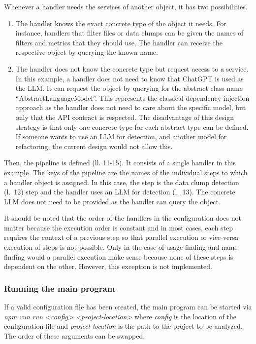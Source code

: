 Whenever a handler needs the services of another object, it has two possibilities.
\begin{enumerate}
    \item The handler knows the exact concrete type of the object it needs. For instance, handlers that filter files or data clumps can be given the names of filters and metrics that they should use. The handler can receive the respective object by querying the known name. 

    \item The handler does not know the concrete type but request access to a service. In this example, a handler does not need to know that ChatGPT is used as the \ac{LLM}. It can request the object by querying for the abstract class name \enquote{AbstractLanguageModel}. This represents the classical dependency injection approach as the handler does not need to care about the specific model, but only that the \ac{API} contract is respected. The disadvantage of this design strategy is that only one  concrete type for each abstract type can be defined. If someone wants to use an \ac{LLM} for detection, and another model for refactoring, the current design would not allow this. 
\end{enumerate}




Then, the pipeline is defined (ll. 11-15). It consists of a single handler in this example. The keys of the pipeline are the names of the individual steps to which a handler object is assigned. In this case, the step is the data clump detection (l.~12) step and the  handler uses an \ac{LLM} for detection (l.~13). The concrete \ac{LLM} does not need to be provided as the handler can query the object. 


It should be noted that the order of the handlers in the configuration  does not matter because the execution order is constant and in most cases, each step requires the context of a previous step so that parallel execution or vice-versa execution of steps is not possible. Only in the case of usage finding and name finding would a parallel execution make sense because none of these steps is dependent on the other.  However, this exception is not implemented.


\subsubsection{Running the main program}


If a valid configuration file has been created, the main program can be started via \textit{npm run run <config> <project-location>} where \textit{config} is the location of the configuration file and \textit{project-location} is the path to the project to be analyzed. The order of these arguments can be swapped. 

